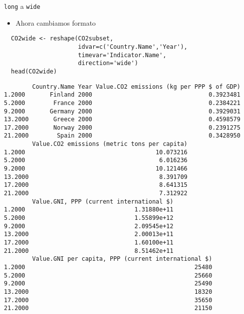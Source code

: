 \documentclass[xcolor={usenames,svgnames,dvipsnames}]{beamer}
\begin{document}
\begin{frame}[fragile,label=sec-3-2-4]{\texttt{long} a \texttt{wide}}
 \begin{itemize}
\item Ahora cambiamos formato
\end{itemize}
\lstset{language=R,label= ,caption= ,numbers=none}
\begin{lstlisting}
  CO2wide <- reshape(CO2subset,
                     idvar=c('Country.Name','Year'),
                     timevar='Indicator.Name',
                     direction='wide')
  head(CO2wide)
\end{lstlisting}

\begin{verbatim}
        Country.Name Year Value.CO2 emissions (kg per PPP $ of GDP)
1.2000       Finland 2000                                 0.3923481
5.2000        France 2000                                 0.2384221
9.2000       Germany 2000                                 0.3929031
13.2000       Greece 2000                                 0.4598579
17.2000       Norway 2000                                 0.2391275
21.2000        Spain 2000                                 0.3428950
        Value.CO2 emissions (metric tons per capita)
1.2000                                     10.073216
5.2000                                      6.016236
9.2000                                     10.121466
13.2000                                     8.391709
17.2000                                     8.641315
21.2000                                     7.312922
        Value.GNI, PPP (current international $)
1.2000                               1.31880e+11
5.2000                               1.55899e+12
9.2000                               2.09545e+12
13.2000                              2.00013e+11
17.2000                              1.60100e+11
21.2000                              8.51462e+11
        Value.GNI per capita, PPP (current international $)
1.2000                                                25480
5.2000                                                25660
9.2000                                                25490
13.2000                                               18320
17.2000                                               35650
21.2000                                               21150
\end{verbatim}
\end{frame}
\end{document}
